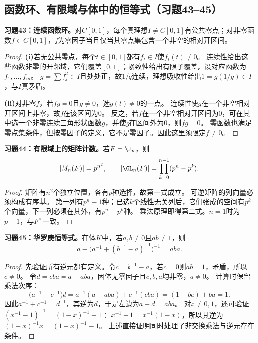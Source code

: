 \subsection*{函数环、有限域与体中的恒等式（习题43--45）}

\begin{problem}
\textbf{习题43：连续函数环。}对$C[0,1]$，每个真理想$I\neq C[0,1]$有公共零点；对非零函数$f\in C[0,1]$，$f$为零因子当且仅当其零点集包含一个非空的相对开区间。
\end{problem}
\begin{proof}
\textbf{(i)}若无公共零点，每个$t\in[0,1]$都有$f_t\in I$使$f_t(t)\neq0$。
连续性给出这些函数非零的开邻域，它们覆盖$[0,1]$；紧致性给出有限子覆盖，设对应函数为$f_1,\ldots,f_m$。
$g=\sum f_j^2\in I$且处处正，故$1/g$连续，理想吸收性给出$1=g(1/g)\in I$，与$I$真矛盾。

\textbf{(ii)}对非零$f$，若$fg=0$且$g\neq0$，选$g(t)\neq0$的一点。
连续性使$g$在一个非空相对开区间上非零，故$f$在该区间为0。
反之，若$f$在一个非空相对开区间为0，可在其中选一个非零连续三角形状函数$g$，并使$g$在区间外为0，则$fg=0$。
零函数也满足零点集条件，但按零因子的定义，它不是零因子。因此这里须限定$f\neq0$。
\end{proof}

\begin{problem}
\textbf{习题44：有限域上的矩阵计数。}若$F=\F_p$，则
\[
|M_n(F)|=p^{n^2},\qquad
|\GL_n(F)|=\prod_{k=0}^{n-1}(p^n-p^k).
\]
\end{problem}
\begin{proof}
矩阵有$n^2$个独立位置，各有$p$种选择，故第一式成立。
可逆矩阵的列向量必须构成有序基。
第一列有$p^n-1$种；已选$k$个线性无关列后，它们张成的空间有$p^k$个向量，下一列必须在其外，有$p^n-p^k$种。
乘法原理即得第二式。$n=1$时为$p-1$，与$F^\times$一致。
\end{proof}

\begin{problem}
\textbf{习题45：华罗庚恒等式。}在体$K$中，若$a,b\neq0$且$ab\neq1$，则
\[
a-\bigl(a^{-1}+(b^{-1}-a)^{-1}\bigr)^{-1}=aba.
\]
\end{problem}
\begin{proof}
先验证所有逆元都有定义。令$c=b^{-1}-a$，若$c=0$则$ab=1$，矛盾，所以$c\neq0$。
令$d=cba=a-aba$，因体无零因子且$c,b,a$均非零，$d\neq0$。
计算时保留乘法次序：
\[
\bigl(a^{-1}+c^{-1}\bigr)d
=a^{-1}(a-aba)+c^{-1}(cba)
=(1-ba)+ba=1.
\]
因此$a^{-1}+c^{-1}=d^{-1}$，其逆为$d$，于是左边为$a-d=aba$。
对$x\neq0,1$，还可验证$(x^{-1}-1)^{-1}=(1-x)^{-1}-1$：
$x^{-1}-1=x^{-1}(1-x)$，所以其逆为$(1-x)^{-1}x=(1-x)^{-1}-1$。
上述直接证明同时处理了非交换乘法与逆元存在条件。
\end{proof}
